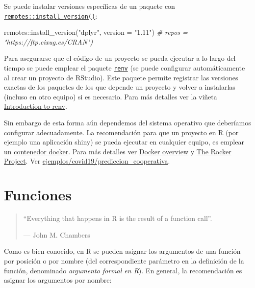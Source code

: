 \documentclass[
]{book}
\newenvironment{Shaded}{\begin{snugshade}}{\end{snugshade}}
\newcommand{\AttributeTok}[1]{\textcolor[rgb]{0.77,0.63,0.00}{#1}}
\newcommand{\CommentTok}[1]{\textcolor[rgb]{0.56,0.35,0.01}{\textit{#1}}}
\newcommand{\FunctionTok}[1]{\textcolor[rgb]{0.00,0.00,0.00}{#1}}
\newcommand{\NormalTok}[1]{#1}
\newcommand{\SpecialCharTok}[1]{\textcolor[rgb]{0.00,0.00,0.00}{#1}}
\newcommand{\StringTok}[1]{\textcolor[rgb]{0.31,0.60,0.02}{#1}}
\theoremstyle{break}
\theoremstyle{nonumberplain}
\begin{document}
Se puede instalar versiones específicas de un paquete con \href{https://remotes.r-lib.org/reference/install_version.html}{\texttt{remotes::install\_version()}}:

\begin{Shaded}
\begin{Highlighting}[]
\NormalTok{remotes}\SpecialCharTok{::}\FunctionTok{install\_version}\NormalTok{(}\StringTok{"dplyr"}\NormalTok{, }\AttributeTok{version =} \StringTok{"1.11"}\NormalTok{) }\CommentTok{\# repos = "https://ftp.cixug.es/CRAN")}
\end{Highlighting}
\end{Shaded}

Para asegurarse que el código de un proyecto se pueda ejecutar a lo largo del tiempo se puede emplear el paquete \href{https://rstudio.github.io/renv/}{\texttt{renv}} (se puede configurar automáticamente al crear un proyecto de RStudio).
Este paquete permite registrar las versiones exactas de los paquetes de los que depende un proyecto y volver a instalarlas (incluso en otro equipo) si es necesario. Para más detalles ver la viñeta \href{https://rstudio.github.io/renv/articles/renv.html}{Introduction to renv}.

Sin embargo de esta forma aún dependemos del sistema operativo que deberíamos configurar adecuadamente.
La recomendación para que un proyecto en R (por ejemplo una aplicación shiny) se pueda ejecutar en cualquier equipo, es emplear un \href{https://es.wikipedia.org/wiki/Docker_(software)}{contenedor docker}.
Para más detalles ver \href{https://docs.docker.com/get-started/overview/}{Docker overview} y \href{https://rocker-project.org/}{The Rocker Project}.
Ver \href{ejemplos/covid19/prediccion_cooperativa/vii_xornadasr.html}{ejemplos/covid19/prediccion\_cooperativa}.

\hypertarget{funciones}{%
\section{Funciones}\label{funciones}}

\begin{quote}
``Everything that happens in R is the result of a function call''.

--- John M. Chambers
\end{quote}

Como es bien conocido, en R se pueden asignar los argumentos de una función por posición o por nombre (del correspondiente parámetro en la definición de la función, denominado \emph{argumento formal en R}).
En general, la recomendación es asignar los argumentos por nombre:
\end{document}
